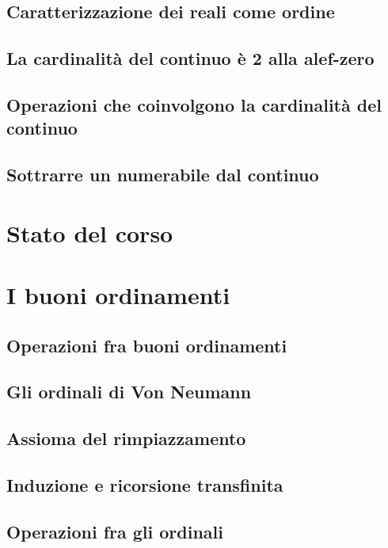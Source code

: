 \documentclass[11pt]{scrartcl}
\begin{document}
\subsection{Caratterizzazione dei reali come ordine}
\newpage
\subsection{La cardinalità del continuo è 2 alla alef-zero}
\newpage
\subsection{Operazioni che coinvolgono la cardinalità del continuo}
\newpage
\subsection{Sottrarre un numerabile dal continuo}




\newpage
\section{Stato del corso}




\newpage
\section{I buoni ordinamenti}
\subsection{Operazioni fra buoni ordinamenti}
\newpage
\subsection{Gli ordinali di Von Neumann}
\newpage
\subsection{Assioma del rimpiazzamento}
\newpage
\subsection{Induzione e ricorsione transfinita}
\newpage
\subsection{Operazioni fra gli ordinali}




\newpage
\end{document}
